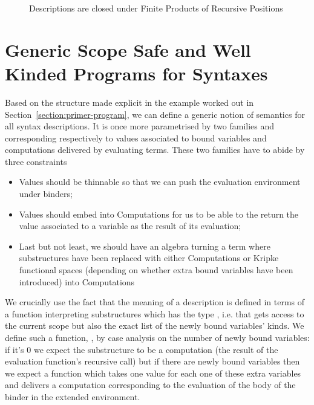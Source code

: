 \begin{figure}[h]
\begin{minipage}{0.45\textwidth}
\end{minipage}\hspace{2em}
\begin{minipage}{0.45\textwidth}
\end{minipage}
\caption{Descriptions are closed under Finite Products of Recursive Positions}
\end{figure}




\section{Generic Scope Safe and Well Kinded Programs for Syntaxes}\label{section:semantics}

Based on the structure made explicit in the example worked out
in Section~\ref{section:primer-program}, we can define a generic notion of
semantics for all syntax descriptions. It is once more parametrised
by two  families  and  corresponding
respectively to values associated to bound variables and
computations delivered by evaluating terms. These two families
have to abide by three constraints
\begin{itemize}
\item Values should be thinnable so that we can push the
      evaluation environment under binders;
\item Values should embed into Computations for us to be able
      to the return the value associated to a variable as the
      result of its evaluation;
\item Last but not least, we should have an algebra turning
      a term where substructures have been replaced with
      either Computations or Kripke functional spaces (depending
      on whether extra bound variables have been introduced)
      into Computations
\end{itemize}
We crucially use the fact that the meaning of a description is
defined in terms of a function interpreting substructures which has
the type    , i.e. that gets access
to the current scope but also the exact list of the newly bound variables' kinds.
We define such a function, , by case analysis on the number
of newly bound variables: if it's $0$ we expect the substructure
to be a computation (the result of the evaluation function's
recursive call) but if there are newly bound variables then we expect
a function which takes one value for each one of these extra variables
and delivers a computation corresponding to the evaluation of the body
of the binder in the extended environment.

